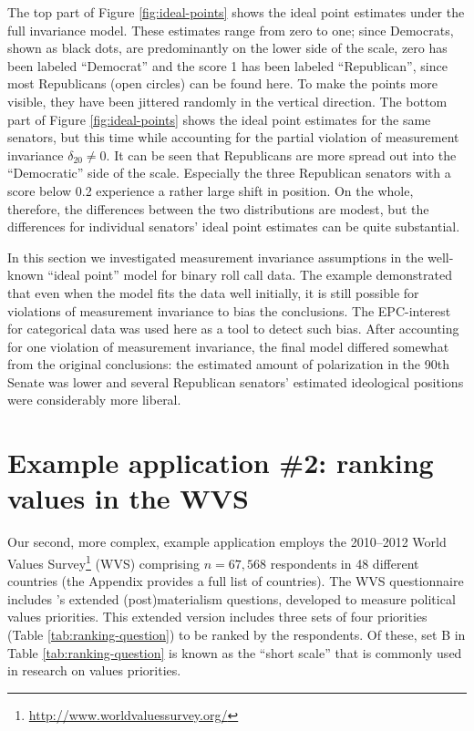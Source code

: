 \documentclass[letterpaper,12pt]{article}
\begin{document}
The top part of Figure \ref{fig:ideal-points} shows the ideal point estimates under the full invariance model. These estimates range from zero to one; since Democrats, shown as black dots, are predominantly on the lower side of the scale, zero has been labeled ``Democrat'' and the score 1 has been labeled ``Republican'', since most Republicans (open circles) can be found here. To make the points more visible, they have been jittered randomly in the vertical direction. The bottom part of Figure \ref{fig:ideal-points} shows the ideal point estimates for the same senators, but this time while accounting for the partial violation of measurement invariance $\delta_{20}\neq0$. It can be seen that Republicans  are more spread out into the ``Democratic'' side of the scale. Especially the three Republican senators with a score below 0.2 experience a rather large shift in position. On the whole, therefore, the differences between the two distributions are modest, but the differences for individual senators' ideal point estimates can be quite substantial.

\bigskip
In this section we investigated measurement invariance assumptions in the well-known ``ideal point'' model for  binary roll call data. The  example  demonstrated that even when the model fits the data well initially, it is still possible for violations of measurement invariance to bias the conclusions. The EPC-interest for categorical data was used here as a tool to detect such bias. After accounting for one violation of measurement invariance, the final model differed somewhat from the original conclusions: the estimated amount of polarization in the 90th Senate was lower and several Republican senators' estimated ideological positions were considerably more liberal. 





\section{Example application \#2: ranking values in the WVS}
\label{sec:WVS}

Our second, more complex, example application employs the 2010--2012 World Values Survey\footnote{\url{http://www.worldvaluessurvey.org/}} (WVS) comprising $n = 67,568$ respondents in 48 different countries (the Appendix provides a full list of countries).
The WVS questionnaire includes \citet{inglehart1977silent}'s extended (post)materialism questions, developed to measure political values priorities. This extended version includes three sets of four priorities (Table \ref{tab:ranking-question}) to be ranked by the respondents. Of these, set B in Table \ref{tab:ranking-question} is known as the ``short scale'' that is commonly used in research on values priorities.  
\end{document}
